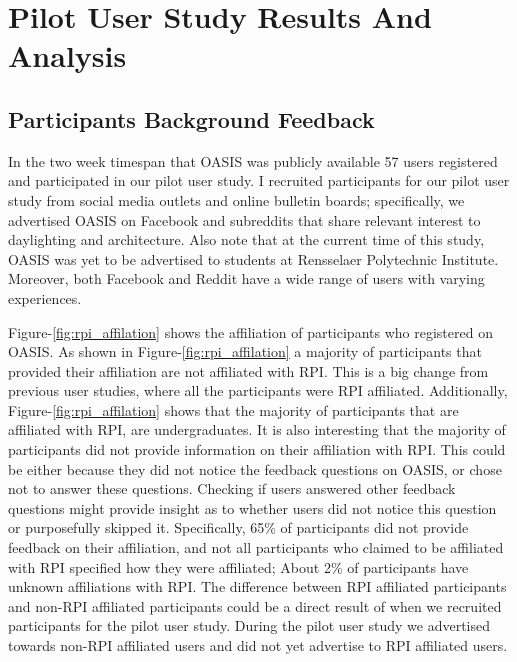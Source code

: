 \chapter{Pilot User Study Results And Analysis} \label{sec:results}



\section{Participants Background Feedback}

In the two week timespan that OASIS was publicly available 57 users registered and participated in our pilot user study.
I recruited participants for our pilot user study from social media outlets and online bulletin boards; specifically, we advertised OASIS on Facebook\cite{todo} and subreddits\cite{todo} that share relevant interest to daylighting and architecture. Also note that at the  current time of this study, OASIS was yet to be advertised to students at Rensselaer Polytechnic Institute. Moreover, both Facebook and Reddit have a wide range of users with varying experiences.

Figure-\ref{fig:rpi_affilation} shows the affiliation of participants who registered on OASIS.
As shown in Figure-\ref{fig:rpi_affilation} a majority of participants that provided their affiliation are not affiliated with RPI. 
This is a big change from previous user studies, where all the participants were RPI affiliated.
Additionally, Figure-\ref{fig:rpi_affilation} shows that the majority of participants that are affiliated with RPI, are undergraduates.
It is also interesting that the majority of participants did not provide information on their affiliation with RPI.
This could be either because they did not notice the feedback questions on OASIS, or chose not to answer these questions.
Checking if users answered other feedback questions might provide insight as to whether users did not notice this question or purposefully skipped it. 
Specifically, 65\% of participants did not provide feedback on their affiliation, and not all participants who claimed to be affiliated with RPI specified how they were affiliated;
About 2\% of participants have unknown affiliations with RPI.
The difference between RPI affiliated participants and non-RPI affiliated participants could be a direct result of when we recruited participants for the pilot user study.
During the pilot user study we advertised towards non-RPI affiliated users and did not yet advertise to RPI affiliated users. 

